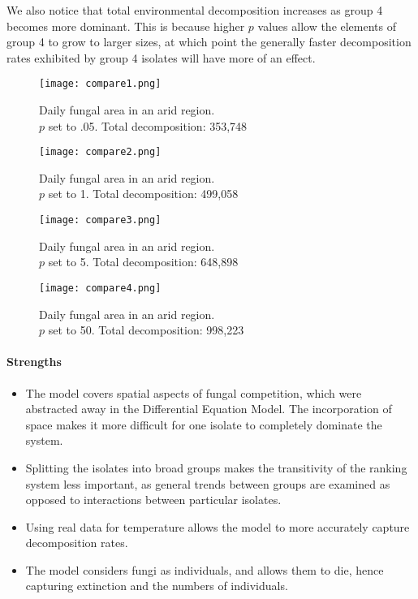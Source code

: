 \documentclass[12pt]{article}
\begin{document}
We also notice that total environmental decomposition increases as group 4 becomes more dominant. This is because higher $p$ values allow the elements of group 4 to grow to larger sizes, at which point the generally faster decomposition rates exhibited by group 4 isolates will have more of an effect.  
\begin{figure}[!ht]
    \centering
    \begin{minipage}{0.48\textwidth}
        \centering
        \texttt{[image: compare1.png]}
        \caption{Daily fungal area in an arid region. \\$p$ set to .05. Total decomposition: 353,748}
        \label{fig:compare1}
    \end{minipage}\hfill
    \begin{minipage}{0.48\textwidth}
        \texttt{[image: compare2.png]}
        \caption{Daily fungal area in an arid region. \\$p$ set to 1. Total decomposition: 499,058 }
        \label{fig:compare2} 
    \end{minipage}
    \begin{minipage}{0.48\textwidth}
        \texttt{[image: compare3.png]}
        \caption{Daily fungal area in an arid region.\\ $p$ set to 5. Total decomposition: 648,898}
        \label{fig:compare3} 
    \end{minipage}\hfill
    \begin{minipage}{0.48\textwidth}
        \texttt{[image: compare4.png]}
        \caption{Daily fungal area in an arid region. \\$p$ set to 50. Total decomposition: 998,223}
        \label{fig:compare4} 
    \end{minipage}
\end{figure}


\paragraph{Strengths}
\begin{itemize}
    \item The model covers spatial aspects of fungal competition, which were abstracted away in the Differential Equation Model. The incorporation of space makes it more difficult for one isolate to completely dominate the system.
    \item Splitting the isolates into broad groups makes the transitivity of the ranking system less important, as general trends between groups are examined as opposed to interactions between particular isolates.
    \item Using real data for temperature allows the model to more accurately capture decomposition rates.
    \item The model considers fungi as individuals, and allows them to die, hence capturing extinction and the numbers of individuals.
\end{itemize}
\end{document}
